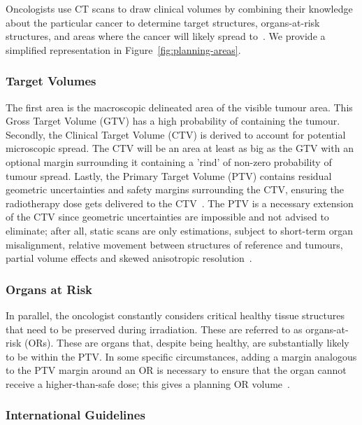 \documentclass[11pt,twoside]{report}
\begin{document}
Oncologists use CT scans to draw clinical volumes by combining their knowledge about the particular cancer to determine target structures, organs-at-risk structures, and areas where the cancer will likely spread to~\cite{AMLART-data}. We provide a simplified representation in Figure~\ref{fig:planning-areas}.

\subsubsection{Target Volumes}

The first area is the macroscopic delineated area of the visible tumour area. This Gross Target Volume (GTV) has a high probability of containing the tumour. Secondly, the Clinical Target Volume (CTV) is derived to account for potential microscopic spread. The CTV will be an area at least as big as the GTV with an optional margin surrounding it containing a 'rind' of non-zero probability of tumour spread. Lastly, the Primary Target Volume (PTV) contains residual geometric uncertainties and safety margins surrounding the CTV, ensuring the radiotherapy dose gets delivered to the CTV~\cite{tumor-delineation,defining-target-volumes,Lin2021-oz,personalised-PTV-strategies}. The PTV is a necessary extension of the CTV since geometric uncertainties are impossible and not advised to eliminate; after all, static scans are only estimations, subject to short-term organ misalignment, relative movement between structures of reference and tumours, partial volume effects and skewed anisotropic resolution~\cite{VANHERK200452}.

\subsubsection{Organs at Risk}

In parallel, the oncologist constantly considers critical healthy tissue structures that need to be preserved during irradiation. These are referred to as organs-at-risk (ORs). These are organs that, despite being healthy, are substantially likely to be within the PTV. In some specific circumstances, adding a margin analogous to the PTV margin around an OR is necessary to ensure that the organ cannot receive a higher-than-safe dose; this gives a planning OR volume~\cite{defining-target-volumes}.

\subsubsection{International Guidelines}
\end{document}
